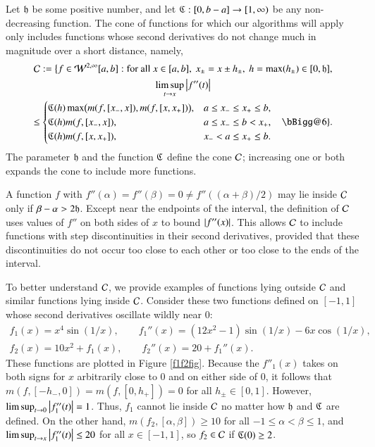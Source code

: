 \documentclass[review]{elsarticle}
\makeatletter
\newcommand{\Vast}{\bBigg@{6}}
\newcommand{\Vastr}{\mathclose\Vast}
\makeatother
\begin{document}
Let $\mathfrak{h}$ be some positive number, and let $\mathfrak{C} : [0,b-a] \to [1,\infty)$ be any
non-decreasing function. The cone of functions for which our algorithms will
apply only includes functions whose second derivatives do not change much in
magnitude over a short distance, namely,
\begin{multline} \label{conedef}
\cc : = \bigl \{ f \in \cw^{2,\infty}[a,b] : \text{for all }x \in [a,b], \ x_\pm = x \pm h_\pm, \ h = \max(h_{\pm}) \in [0, \fh], \\  \limsup_{t \to x}\abs{f''(t)} \\
\le \begin{cases} \fC(h) \max\bigl(m(f,[x_-,x]),m(f,[x,x_+])\bigr), & a \le x_- \le x_+ \le b,\\
\fC(h) m(f,[x_-,x]), & a \le x_- \le b <  x_+, \\
\fC(h) m(f,[x,x_+]), & x_- < a \le x_+ \le b.
\end{cases} \quad
 \Vastr \}.
\end{multline}
The parameter $\mathfrak{h}$ and the function $\mathfrak{C}$ define the cone $\mathcal{C}$; increasing
one or both expands the cone to include more functions.

A function $f$ with $f''(\alpha) = f''(\beta) = 0 \ne f''((\alpha+\beta)/2)$ may
lie inside $\mathcal{C}$ only if $\beta - \alpha > 2\mathfrak{h}$. Except near the endpoints of
the interval, the definition of $\mathcal{C}$ uses values of $f''$ on both sides of $x$
to bound $\left \lvert f''(x) \right \rvert$. This allows $\mathcal{C}$ to include functions with step
discontinuities in their second derivatives, provided that these discontinuities
do not occur too close to each other or too close to the ends of the interval.

To better understand $\mathcal{C}$, we provide examples of functions lying outside $\mathcal{C}$
and similar functions lying inside $\mathcal{C}$. Consider these two functions defined
on $[-1,1]$ whose second derivatives oscillate wildly near $0$:
\begin{gather*}
f_1(x) = x^4 \sin(1/x), \qquad f_1''(x) = (12x^2 - 1) \sin(1/x) -6 x \cos(1/x), \\
f_2(x) = 10  x^2 + f_1(x), \qquad f_2''(x) = 20+ f_1''(x).
\end{gather*}
These functions are plotted in Figure \ref{f1f2fig}. Because the $f''_1(x)$
takes on both signs for $x$ arbitrarily close to $0$ and on either side of $0$,
it follows that $m(f,[-h_-,0]) = m(f,[0,h_+]) = 0$ for all $h_\pm \in [0,1]$.
However, $\limsup_{t \to 0} \left \lvert f''_1(t) \right \rvert = 1$. Thus, $f_1$ cannot lie inside
$\mathcal{C}$ no matter how $\mathfrak{h}$ and $\mathfrak{C}$ are defined. On the other hand,
$m(f_2,[\alpha, \beta]) \ge 10$ for all $-1 \le \alpha < \beta \le 1$, and
$\limsup_{t \to x} \left \lvert f''_1(t) \right \rvert \le 20$ for all $x \in [-1,1]$, so $f_2 \in
\mathcal{C}$ if $\mathfrak{C}(0) \ge 2$.
\end{document}
